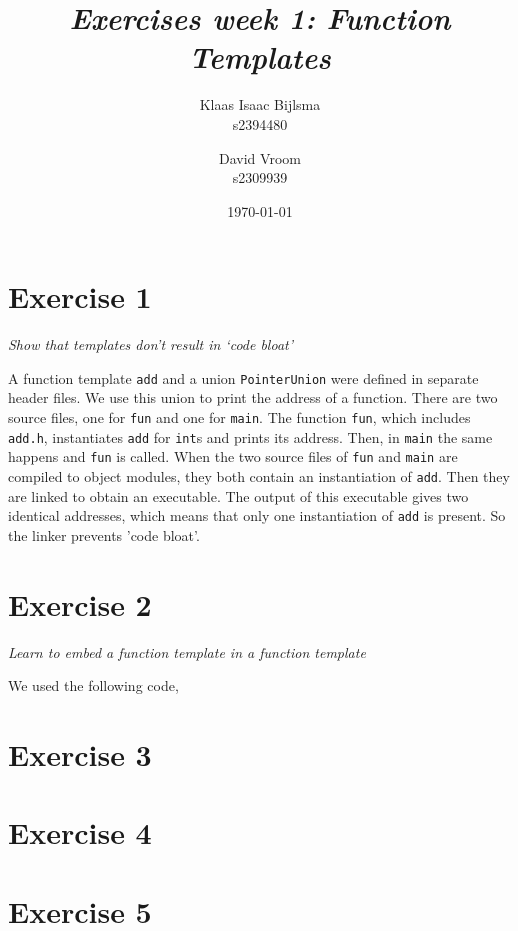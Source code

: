 \documentclass[12pt]{article}
\title{\itshape Exercises week 1: Function Templates}
\author{
	Klaas Isaac Bijlsma \\ s2394480
	\and
	David Vroom \\ s2309939
}
\date{\today}
\newcommand{\desc}[1]{\textit{#1} \vspace{1em}}
\begin{document}
\maketitle

\section*{Exercise 1}
\desc{Show that templates don't result in `code bloat'}

A function template \texttt{add} and a union \texttt{PointerUnion} were defined in separate header files. We use this union to print the address of a function. There are two source files, one for \texttt{fun} and one for \texttt{main}. The function \texttt{fun}, which includes \texttt{add.h}, instantiates \texttt{add} for \texttt{int}s and prints its address. Then, in \texttt{main} the same happens and \texttt{fun} is called. When the two source files of \texttt{fun} and \texttt{main} are compiled to object modules, they both contain an instantiation of \texttt{add}. Then they are linked to obtain an executable. The output of this executable gives two identical addresses, which means that only one instantiation of \texttt{add} is present. So the linker prevents 'code bloat'.







\clearpage

\section*{Exercise 2}
\desc{Learn to embed a function template in a function template}

We used the following code,






\clearpage

\section*{Exercise 3}
\desc{}


\clearpage

\section*{Exercise 4}
\desc{}


\clearpage

\section*{Exercise 5}
\desc{}


\clearpage
\end{document}
